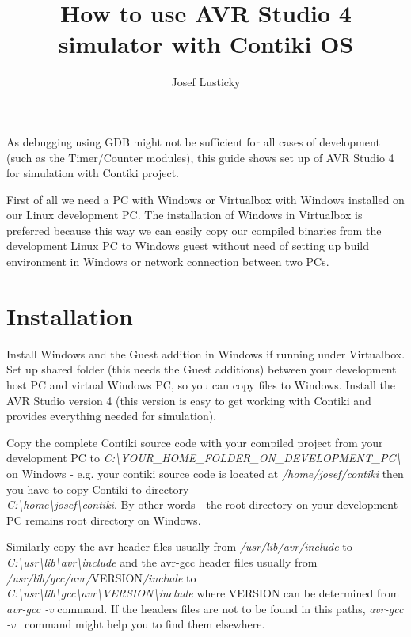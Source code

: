 \documentclass{article}
\begin{document}
\title{How to use AVR Studio 4 simulator with Contiki OS}
\author{Josef Lusticky}

\maketitle

As debugging using GDB might not be sufficient for all cases of development (such as the Timer/Counter modules),
this guide shows set up of AVR Studio 4 for simulation with Contiki project.

First of all we need a PC with Windows or Virtualbox with Windows installed on our Linux development PC.
The installation of Windows in Virtualbox is preferred because this way we can easily copy our compiled binaries
from the development Linux PC to Windows guest
without need of setting up build environment in Windows or network connection between two PCs.

\section{Installation}
Install Windows and the Guest addition in Windows if running under Virtualbox.
Set up shared folder (this needs the Guest additions) between your development host PC and virtual Windows PC, so you can copy files to Windows.
Install the AVR Studio version 4 (this version is easy to get working with Contiki and provides everything needed for simulation).

Copy the complete Contiki source code with your compiled project from your development PC to
{\it{C:\textbackslash YOUR\_HOME\_FOLDER\_ON\_DEVELOPMENT\_PC\textbackslash}}
on Windows - e.g. your contiki source code is located at {\it{/home/josef/contiki}}
then you have to copy Contiki to directory \\
{\it{C:\textbackslash home\textbackslash josef\textbackslash contiki}}.
By other words - the root directory on your development PC remains root directory on Windows.

Similarly copy the avr header files usually from {\it{/usr/lib/avr/include}} to
{\it{C:\textbackslash usr\textbackslash lib\textbackslash avr\textbackslash include}}
and the avr-gcc header files usually from {\it{/usr/lib/gcc/avr/}}VERSION{\it{/include}} to \\
{\it{C:\textbackslash usr\textbackslash lib\textbackslash gcc\textbackslash avr\textbackslash VERSION\textbackslash include}}
where VERSION can be determined from {\it{avr-gcc -v}} command.
If the headers files are not to be found in this paths, {\it{avr-gcc -v }} command might help you to find them elsewhere.
\end{document}
